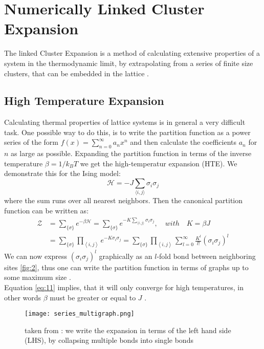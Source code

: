 \documentclass{article}
\begin{document}
\section{Numerically Linked Cluster Expansion}
The linked Cluster Expansion is a method of calculating extensive properties of
a system in the thermodynamic limit, by extrapolating
from a series of finite size clusters, that can be embedded in the
lattice \cite{Rigol,Series,Domb}.\\
\subsection{High Temperature Expansion}

Calculating thermal properties of lattice systems is in general a
very difficult task. One possible way to do this, is to write the
partition function as a power series of the form $f(x) =
\sum_{n=0}^{\infty} a_nx^n$ and then calculate the coefficients $a_n$
for $n$ as large as possible. Expanding the partition function in terms
of the inverse temperature $\beta =
1/k_BT$ we get the high-temperatur expansion (HTE).
We demonstrate this for the Ising model:
\begin{equation}
\label{eq:10}
\mathcal{H} = -J \sum\limits_{\langle i,j \rangle} \sigma_i \sigma_j
\end{equation}
where the sum runs over all nearest neighbors. Then the canonical
partition function can be written as:
\begin{align}
\label{eq:11}
\mathcal{Z} &= \sum\limits_{\{ \sigma \}} e^{-\beta \mathcal{H}} =
\sum\limits_{\{ \sigma \}} e^{-K \sum_{\langle i,j \rangle}
  \sigma_i \sigma_j}, \quad with \quad K = \beta J\\
&= \sum\limits_{\{ \sigma \}} \prod\limits_{\left\langle i,j
  \right\rangle} e^{-K \sigma_i \sigma_j} =  \sum\limits_{\{ \sigma \}} \prod\limits_{\left\langle i,j
  \right\rangle} \sum\limits_{l = 0}^{\infty} \frac{K^l}{l!}(\sigma_i
  \sigma_j )^l
\end{align}
We can now express $(\sigma_i \sigma_j)^l$ graphically as an $l$-fold
bond between neighboring sites \eqref{fig:2}, thus one can write the partition
function in terms of graphs up to some maximum size
\cite{Rigol,Series}.\\
Equation \eqref{eq:11} implies, that it will only converge for high
temperatures, in other words $\beta$ must be greater or equal to $J$ \cite{Rigol}.

\begin{figure}[htbp]
\centerline{\texttt{[image: series\_multigraph.png]}}
\caption[]{\label{fig:2}  taken from \cite{Series}: we write the expansion in terms of the left
  hand side (LHS), by collapsing multiple bonds into single bonds}
\end{figure}
\end{document}
